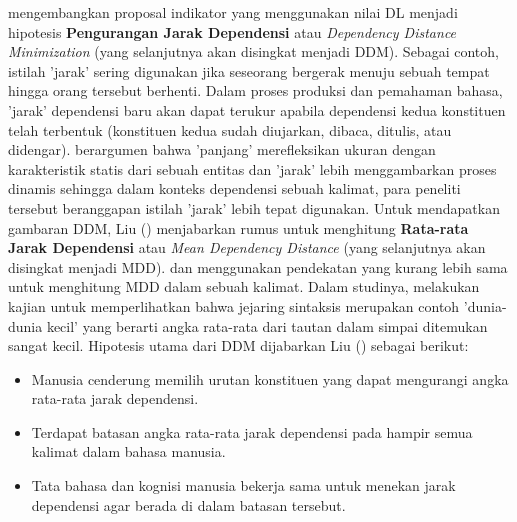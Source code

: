 \cite{liu2017dependency} mengembangkan proposal indikator yang menggunakan nilai DL menjadi hipotesis \textbf{Pengurangan Jarak Dependensi} atau \textit{Dependency Distance Minimization} (yang selanjutnya akan disingkat menjadi DDM). Sebagai contoh, istilah 'jarak' sering digunakan jika seseorang bergerak menuju sebuah tempat hingga orang tersebut berhenti. Dalam proses produksi dan pemahaman bahasa, 'jarak' dependensi baru akan dapat terukur apabila dependensi kedua konstituen telah terbentuk (konstituen kedua sudah diujarkan, dibaca, ditulis, atau didengar).  \cite{liu2017dependency} berargumen bahwa 'panjang' merefleksikan ukuran dengan karakteristik statis dari sebuah entitas dan 'jarak' lebih menggambarkan proses dinamis sehingga dalam konteks dependensi sebuah kalimat, para peneliti tersebut beranggapan istilah 'jarak' lebih tepat digunakan. Untuk mendapatkan gambaran DDM, Liu (\citealp{liu2008dependency, liu2017dependency}) menjabarkan rumus untuk menghitung \textbf{Rata-rata Jarak Dependensi} atau \textit{Mean Dependency Distance} (yang selanjutnya akan disingkat menjadi MDD). \cite{hudson2010introduction} dan \cite{i2004euclidean} menggunakan pendekatan yang kurang lebih sama untuk menghitung MDD dalam sebuah kalimat. Dalam studinya, \cite{i2004patterns} melakukan kajian untuk memperlihatkan bahwa jejaring sintaksis merupakan contoh 'dunia-dunia kecil' yang berarti angka rata-rata dari tautan dalam simpai ditemukan sangat kecil. Hipotesis utama dari DDM dijabarkan Liu (\citealp{liu2008dependency, liu2017dependency}) sebagai berikut:

\begin{itemize}
\item Manusia cenderung memilih urutan konstituen yang dapat mengurangi angka rata-rata jarak dependensi.
\item Terdapat batasan angka rata-rata jarak dependensi pada hampir semua kalimat dalam bahasa manusia.
\item Tata bahasa dan kognisi manusia bekerja sama untuk menekan jarak dependensi agar berada di dalam batasan tersebut.
\end{itemize}

